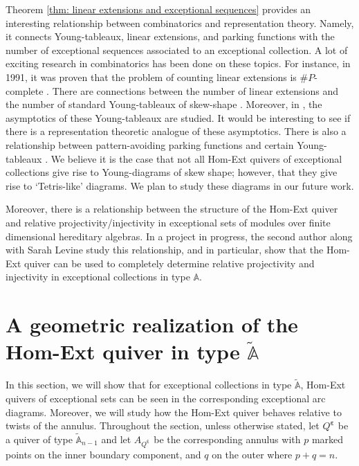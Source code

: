 \documentclass[12pt]{amsart}
\theoremstyle{plain}
\theoremstyle{definition}
\theoremstyle{remark}
\begin{document}
Theorem \ref{thm: linear extensions and exceptional sequences} provides an interesting relationship between combinatorics and representation theory. Namely, it connects Young-tableaux, linear extensions, and parking functions with the number of exceptional sequences associated to an exceptional collection. A lot of exciting {\color{black} research in combinatorics} has been done on these topics. For instance, in 1991, it was proven that the problem of counting linear extensions is $\#P$-complete \cite{brightwell1991counting}. There are connections between the number of linear extensions and the number of standard Young-tableaux of skew-shape \cite{morales2018asymptotics}. Moreover, in \cite{morales2018asymptotics}, the asymptotics of these Young-tableaux are studied. It would be interesting to see if there is a representation theoretic analogue {\color{black} of these asymptotics}. There is also a relationship between pattern-avoiding parking functions and certain Young-tableaux \cite{garcia2024defective}. We believe it is the case that not all Hom-Ext quivers of exceptional collections give rise to Young-diagrams of skew shape; however, that they give rise to `Tetris-like' diagrams. We plan to study these diagrams in our future work. 

{\color{black}
Moreover, there is a relationship between the structure of the Hom-Ext quiver and relative projectivity/injectivity in exceptional sets of modules over finite dimensional hereditary algebras. In a project in progress, the second author along with Sarah Levine study this relationship, and in particular, show that the Hom-Ext quiver can be used to completely determine relative projectivity and injectivity in exceptional collections in type $\mathbb{A}$.
}


\section{A geometric realization of the Hom-Ext quiver in type $\tilde{\mathbb{A}}$} \label{sec: H-E quiver is tiling algebra}

In this section, we will show that for exceptional collections in type $\tilde{\mathbb{A}}$, Hom-Ext quivers {\color{black} of exceptional sets} can be seen in the corresponding exceptional arc diagrams. Moreover, we will study how the Hom-Ext quiver behaves relative to twists of the annulus. Throughout the section, unless otherwise stated, let $Q^{\bm{\varepsilon}}$ be a quiver of type $\tilde{\mathbb{A}}_{n-1}$ and let $A_{Q^{\bm{\varepsilon}}}$ be the corresponding annulus with $p$ marked points on the inner boundary component, and $q$ on the outer where $p + q = n$. 
\end{document}
